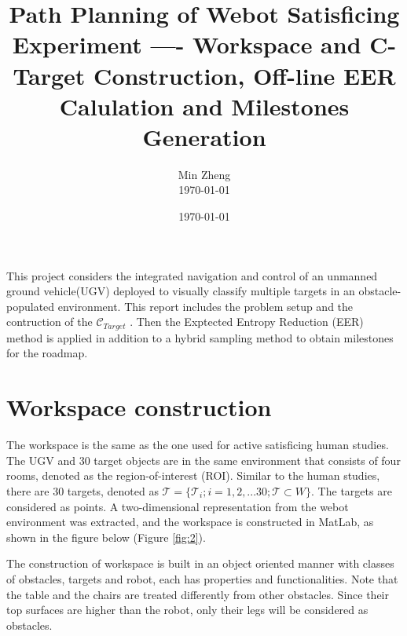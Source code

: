 \documentclass[12pt,draftcls,onecolumn]{IEEEtran}
\begin{document}
\title{Path Planning of Webot Satisficing Experiment ---- Workspace and C-Target Construction, Off-line EER Calulation and Milestones Generation }


\author{  Min Zheng \\  \today}

\date{\today}

\maketitle



This project considers the integrated navigation and control of an unmanned ground vehicle(UGV) deployed to visually classify multiple targets in an obstacle-populated environment. 
This report includes the problem setup and the contruction of the $\mathcal{C}_{Target}$ . Then the Exptected Entropy Reduction (EER) method is applied in addition to a hybrid sampling method to obtain milestones for the roadmap. 

\section{Workspace construction} 

The workspace is the same as the one used for active satisficing human studies. 
The UGV and 30 target objects are in the same environment that consists of four rooms, denoted as the region-of-interest (ROI).
Similar to the human studies, there are 30 targets, denoted as $\mathcal{T} = \{\mathcal{T}_i; i = 1,2,...30; \mathcal{T} \subset W \}$.
The targets are considered as points.
A two-dimensional representation from the webot environment was extracted, and the workspace is constructed in MatLab, as shown in the figure below  (Figure \ref{fig:2}). 


The construction of workspace is built in an object oriented manner with classes of obstacles, targets and robot, each has properties and functionalities.  
Note that the table and the chairs are treated differently from other obstacles.
Since their top surfaces are higher than the robot, only their legs will be considered as obstacles. 
\end{document}

